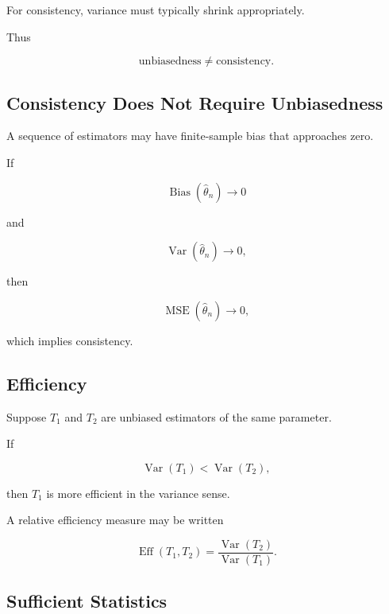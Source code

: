 For consistency, variance must typically shrink appropriately.

Thus

\[
\boxed{
\text{unbiasedness}
\neq
\text{consistency}.
}
\]

\subsection{Consistency Does Not Require Unbiasedness}
\label{subsec:consistent-biased}

A sequence of estimators may have finite-sample bias that approaches zero.

If

\[
\operatorname{Bias}(\widehat{\theta}_n)\to0
\]

and

\[
\operatorname{Var}(\widehat{\theta}_n)\to0,
\]

then

\[
\operatorname{MSE}(\widehat{\theta}_n)\to0,
\]

which implies consistency.

\subsection{Efficiency}
\label{subsec:estimator-efficiency}

Suppose \(T_1\) and \(T_2\) are unbiased estimators of the same parameter.

If

\[
\operatorname{Var}(T_1)
<
\operatorname{Var}(T_2),
\]

then \(T_1\) is more efficient in the variance sense.

A relative efficiency measure may be written

\[
\boxed{
\operatorname{Eff}(T_1,T_2)
=
\frac{
\operatorname{Var}(T_2)
}{
\operatorname{Var}(T_1)
}.
}
\]

\subsection{Sufficient Statistics}
\label{subsec:sufficient-statistics}

